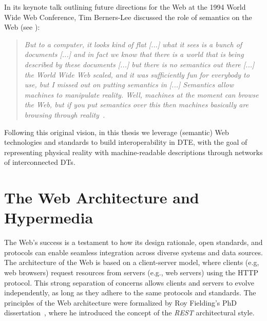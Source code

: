 In its keynote talk outlining future directions for the Web at the 1994 World Wide Web Conference, Tim Berners-Lee discussed the role of semantics on the Web (see ): 

\begin{quote}
\emph{
But to a computer, it looks kind of flat [...] what it sees is a bunch of documents [...] and in fact we know that there is a world that is being described by these documents [...] but there is no semantics out there [...] the World Wide Web scaled, and it was sufficiently fun for everybody to use, but I missed out on putting semantics in [...] Semantics allow machines to manipulate reality. Well, machines at the moment can browse the Web, but if you put semantics over this then machines basically are browsing through reality~\cite{bernerslee1994keynote}.
}
\end{quote}

Following this original vision, in this thesis we leverage (semantic) Web technologies and standards to build interoperability in \ac{DTE}, with the goal of representing physical reality with machine-readable descriptions through networks of interconnected \acp{DT}.

\section{The Web Architecture and Hypermedia}


The Web's success is a testament to how its design rationale, open standards, and protocols can enable seamless integration across diverse systems and data sources.
%
The architecture of the Web is based on a client-server model, where clients (e.g, web browsers) request resources from servers (e.g., web servers) using the \ac{HTTP} protocol.
%
This strong separation of concerns allows clients and servers to evolve independently, as long as they adhere to the same protocols and standards.
%
The principles of the Web architecture were formalized by Roy Fielding's PhD dissertation~\cite{fielding2000architectural}, where he introduced the concept of the \emph{\ac{REST}} architectural style.

